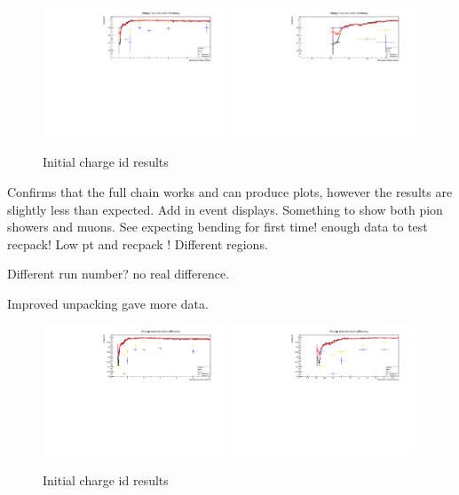 \begin{figure}[h!]
\centering
\includegraphics[width=0.49\textwidth]{figures/oldStudies/newChargeZoom5.pdf}
\includegraphics[width=0.49\textwidth]{figures/oldStudies/newChargeZoom1.pdf}
\caption{Initial charge id results}
\label{fig:ChargeInitial}
\end{figure}
Confirms that the full chain works and can produce plots, however the results are slightly less than expected. Add in event displays. Something to show both pion showers and muons. See expecting bending for first time! enough data to test recpack! Low pt and recpack ! Different regions.

Different run number? no real difference.

Improved unpacking gave more data.

\begin{figure}[h!]
\centering
\includegraphics[width=0.49\textwidth]{figures/testbeam/TestBeam090318Plots/ChargeIDFull6GeV.pdf}
\includegraphics[width=0.49\textwidth]{figures/testbeam/TestBeam090318Plots/ChargeIDFullLow.pdf}
\caption{Initial charge id results}
\label{fig:ChargeImproved}
\end{figure}

